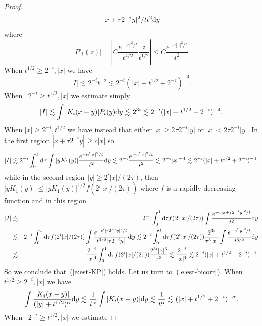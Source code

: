 \begin{appendices}
\begin{proof}
\begin{eqnarray*}
{{    | x + \tau 2^{- i} y |^2 / t}}{t^2} \mathrm{d} y
  \end{eqnarray*}
  where
  \[ | P'_t (z) | = \left| C \frac{e^{- | z |^2 / t}}{t^{4 / 2}} \frac{z}{t^{1
     / 2}} \right| \leqslant C \frac{e^{- c | z |^2 / t}}{t^2} . \]
  When $t^{1 / 2} \geqslant 2^{- i}, | x |$ we have
  \[ | I | \lesssim 2^{- i} t^{- 2} \lesssim 2^{- i} (| x | + t^{1 / 2} + 2^{-
     i})^{- 4} . \]
  When \ $2^{- i} \geqslant t^{1 / 2}, | x |$ we estimate simply
  \[ | I | \lesssim \int | K_i (x - y) | P_t (y) \mathrm{d} y \lesssim 2^{3 i}
     \lesssim 2^{- i} (| x | + t^{1 / 2} + 2^{- i})^{- 4} . \]
  When $| x | \geqslant 2^{- i}, t^{1 / 2}$ we have instead that either $| x |
  \geqslant 2 \tau 2^{- i} | y |$ or $| x | < 2 \tau 2^{- i} | y |$. In the
  first region $| x + \tau 2^{- i} y | \geqslant c | x |$ so
  \[ | I | \lesssim 2^{- i} \int_0^1 \mathrm{d} \tau \int | y K_1 (y) | \frac{e^{-
     c' | x |^2 / t}}{t^2} \mathrm{d} y \lesssim 2^{- i} \frac{e^{- c' | x |^2 /
     t}}{t^2} \lesssim 2^{- i} | x |^{- 4} \lesssim 2^{- i} (| x | + t^{1 / 2}
     + 2^{- i})^{- 4} . \]
  while in the second region $| y | \geqslant 2^i | x | / (2 \tau)$, then $| y
  K_1 (y) | \leqslant | y K_1 (y) |^{1 / 2} f (2^i | x | / (2 \tau))$ where
  $f$ is a rapidly decreasing function and in this region
  \begin{eqnarray*}
    | I | & \lesssim & 2^{- i} \int_0^1 \mathrm{d} \tau f (2^i | x | / (2 \tau))
    \int \frac{e^{- c | x + \tau 2^{- i} y |^2 / t}}{t^2} \mathrm{d} y\\
    & \lesssim & 2^{- i} \int_0^1 \mathrm{d} \tau f (2^i | x | / (2 \tau)) \int
    \frac{e^{- c' | \tau 2^{- i} y |^2 / t}}{t^{3 / 2} | \tau 2^{- i} y |}
    \mathrm{d} y \lesssim 2^{- i} \int_0^1 \mathrm{d} \tau f (2^i | x | / (2 \tau))
    \frac{2^{3 i}}{\tau^3 | x |} \int \frac{e^{- c' | y |^2 / t}}{t^{3 / 2}}
    \mathrm{d} y\\
    & \lesssim & \frac{2^{- i}}{| x |^4} \int_0^1 \mathrm{d} \tau f (2^i | x | /
    (2 \tau)) \frac{2^{3 i} | x |^3}{\tau^3} \lesssim \frac{2^{- i}}{| x |^4}
    \lesssim 2^{- i} (| x | + t^{1 / 2} + 2^{- i})^{- 4} .
  \end{eqnarray*}
  So we conclude that~(\ref{e:est-KP}) holds. Let us turn
  to~(\ref{e:est-bicorr}). When $t^{1 / 2} \geqslant 2^{- i}, | x |$ we have
  \[ \int \frac{| K_i (x - y) |}{(| y | + t^{1 / 2})^{\alpha}} \mathrm{d} y
     \lesssim \frac{1}{t^{\alpha}} \int | K_i (x - y) | \mathrm{d} y \lesssim
     \frac{1}{t^{\alpha}} \lesssim (| x | + t^{1 / 2} + 2^{- i})^{- \alpha} .
  \]
  When \ $2^{- i} \geqslant t^{1 / 2}, | x |$ we estimate

\end{proof}
\end{appendices}
